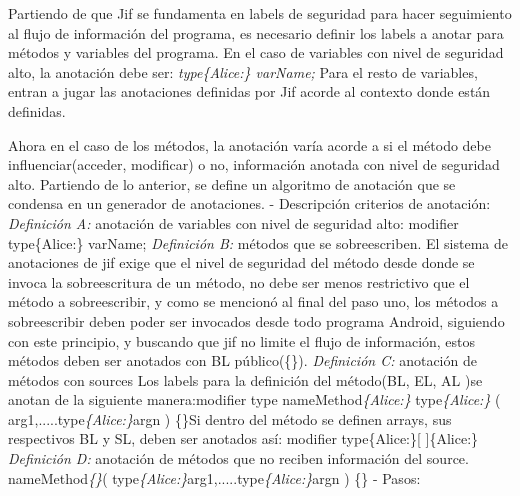 Partiendo de que Jif se fundamenta en labels de seguridad para hacer seguimiento
al flujo de información del programa, es necesario definir los labels a
anotar para métodos y variables del programa.\newline
En el caso de variables con nivel de seguridad  alto, la anotación debe
ser:\newline
\emph{ type\{Alice:\} varName; }\newline
Para el resto de variables, entran a jugar las anotaciones definidas por Jif
acorde al contexto donde están definidas.

Ahora en el caso de los métodos, la anotación varía acorde a si el método debe
influenciar(acceder, modificar) o no, información anotada con nivel de seguridad
alto.
Partiendo de lo anterior, se define un algoritmo de anotación que se condensa en
un generador de anotaciones.\newline 
- Descripción criterios de anotación:\newline
\textit{Definición A:} anotación de variables con nivel de seguridad alto:
\newline 
modifier type\{Alice:\} varName;\newline 
\textit{Definición B:} métodos que se sobreescriben. El sistema de anotaciones
de jif exige que el nivel de seguridad del método desde donde se invoca la
sobreescritura de un método, no debe ser menos restrictivo que el método a
sobreescribir, y como se mencionó al final del paso uno, los métodos a
sobreescribir deben poder ser invocados desde todo programa Android, siguiendo
con este principio, y buscando que jif no limite el flujo de información, estos
métodos deben ser anotados con BL público(\{\}).\newline 
\textit{Definición C:} anotación de métodos con sources\newline
Los labels para la definición del método(BL, EL, AL )se anotan de la
siguiente manera:\newline modifier type
nameMethod\textit{\{Alice:\}} type\textit{\{Alice:\}}
( arg1,.....type\textit{\{Alice:\}}argn ) \{\}\newline Si dentro del método se
definen arrays, sus respectivos BL y SL, deben ser anotados así: modifier type\{Alice:\}[ ]\{Alice:\}\newline
\textit{Definición D:} anotación de métodos que no reciben información del
source. 
nameMethod\textit{\{\}}(
type\textit{\{Alice:\}}arg1,.....type\textit{\{Alice:\}}argn ) \{\}\newline
- Pasos:\newline

